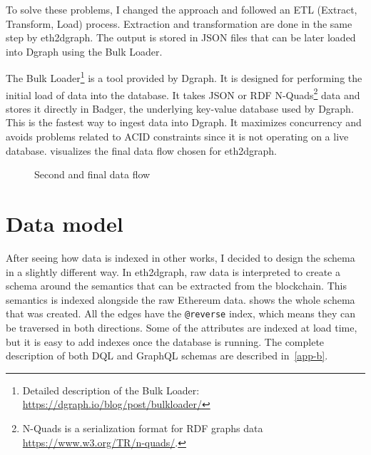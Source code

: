 To solve these problems, I changed the approach and followed an ETL (Extract, Transform, Load) process. Extraction and transformation are done in the same step by eth2dgraph. The output is stored in JSON files that can be later loaded into Dgraph using the Bulk Loader.

The Bulk Loader\footnote{Detailed description of the Bulk Loader: \url{https://dgraph.io/blog/post/bulkloader/}} is a tool provided by Dgraph. It is designed for performing the initial load of data into the database. It takes JSON or RDF N-Quads\footnote{N-Quads is a serialization format for RDF graphs data \url{https://www.w3.org/TR/n-quads/}.} data and stores it directly in Badger, the underlying key-value database used by Dgraph. This is the fastest way to ingest data into Dgraph. It maximizes concurrency and avoids problems related to ACID constraints since it is not operating on a live database.  visualizes the final data flow chosen for eth2dgraph.

\begin{figure}[H]
\centering
{}
\caption[Second and final data flow]{Second and final data flow}
  \label{fig:data-flow-2}
\end{figure}

\section{Data model}

After seeing how data is indexed in other works, I decided to design the schema in a slightly different way. In eth2dgraph, raw data is interpreted to create a schema around the semantics that can be extracted from the blockchain. This semantics is indexed alongside the raw Ethereum data.  shows the whole schema that was created. All the edges have the {\tt @reverse} index, which means they can be traversed in both directions. Some of the attributes are indexed at load time, but it is easy to add indexes once the database is running. The complete description of both DQL and GraphQL schemas are described in~\cref{app-b}.

